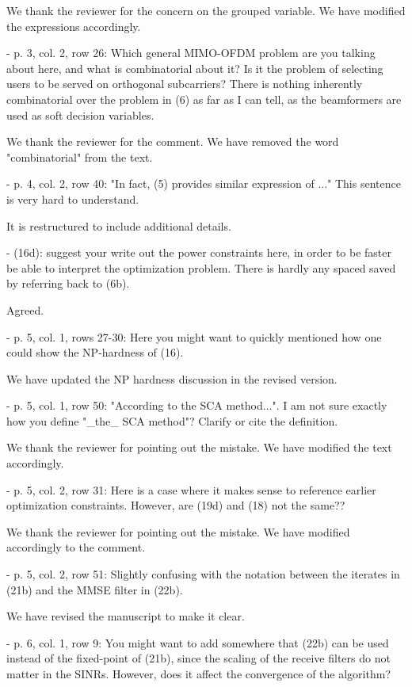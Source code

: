 \resp We thank the reviewer for the concern on the grouped variable. We have modified the expressions accordingly.

 - p. 3, col. 2, row 26: Which general MIMO-OFDM problem are you talking about here, and what is combinatorial about it? Is it the problem of selecting users to be served on orthogonal subcarriers? There is nothing inherently combinatorial over the problem in (6) as far as I can tell, as the beamformers are used as soft decision variables.

\resp We thank the reviewer for the comment. We have removed the word "combinatorial" from the text. 

 - p. 4, col. 2, row 40: "In fact, (5) provides similar expression of ..." This sentence is very hard to understand.

\resp It is restructured to include additional details.

 - (16d): suggest your write out the power constraints here, in order to be faster be able to interpret the optimization problem. There is hardly any spaced saved by referring back to (6b).

\resp Agreed.

 - p. 5, col. 1, rows 27-30: Here you might want to quickly mentioned how one could show the NP-hardness of (16).

\resp We have updated the NP hardness discussion in the revised version.

 - p. 5, col. 1, row 50: "According to the SCA method...". I am not sure exactly how you define "\_the\_ SCA method"? Clarify or cite the definition.

\resp We thank the reviewer for pointing out the mistake. We have modified the text accordingly.

 - p. 5, col. 2, row 31: Here is a case where it makes sense to reference earlier optimization constraints. However, are (19d) and (18) not the same??

\resp We thank the reviewer for pointing out the mistake. We have modified accordingly to the comment.

 - p. 5, col. 2, row 51: Slightly confusing with the notation between the iterates in (21b) and the MMSE filter in (22b).

\resp We have revised the manuscript to make it clear.

 - p. 6, col. 1, row 9: You might want to add somewhere that (22b) can be used instead of the fixed-point of (21b), since the scaling of the receive filters do not matter in the SINRs. However, does it affect the convergence of the algorithm?

